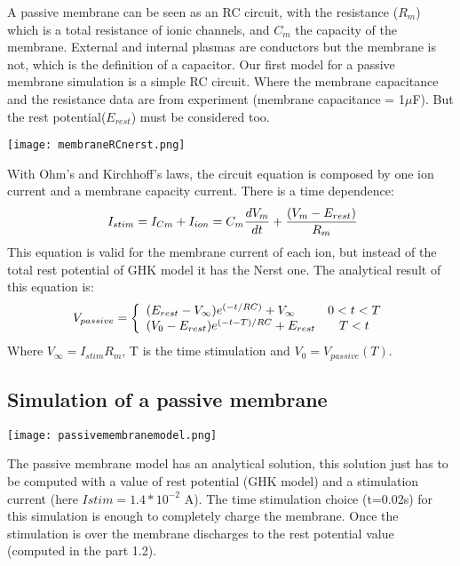 \documentclass[a4paper,11pt]{report}
\begin{document}
A passive membrane can be seen as an RC circuit, with the resistance ($R_{m}$) which is a total resistance of ionic channels, and $C_{m}$ the capacity of the membrane. External and internal plasmas are conductors but the membrane is not, which is the definition of a capacitor. Our first model for a passive membrane simulation is a simple RC circuit. Where the membrane capacitance and the resistance data are from experiment (membrane capacitance = 1$\mu$F). But the rest potential($E_{rest}$) must be considered too.
\begin{center}
\texttt{[image: membraneRCnerst.png]} 
\label{fig1}
\end{center}
With Ohm's and Kirchhoff's laws, the circuit equation is composed by one ion current and a membrane capacity current. There is a time dependence:\\  
$$
\ I_{stim}=I_{Cm}+I_{ion}=C_{m} \frac{dV_{m}}{dt}+ \frac{(V_{m}-E_{rest})}{R_{m}} \\
$$
This equation is valid for the membrane current of each ion, but instead of the total rest potential of GHK model it has the Nerst one. The analytical result of this equation is:\\
$$
 V_{passive}=
\left\{
\begin{array}{l c} 
(E_{rest}-V_{\infty})e^{(-t/RC)}+V_{\infty} & 0 < t < T \\
(V_{0}-E_{rest})e^{(-t-T)/RC}+E_{rest} & T < t 
\end{array}
\right.
$$
Where $V_{\infty}=I_{stim}R_{m}$, T is the time stimulation and $V_{0} =V_{passive}(T)$.  \cite{Tranquillo2009} \\

\subsection{Simulation of a passive membrane}


\begin{minipage}{0.5\linewidth}
\texttt{[image: passivemembranemodel.png]} 
\label{fig1}
\end{minipage}\hfill
\begin{minipage}{0.45\linewidth}
The passive membrane model has an analytical solution, this solution just has to be computed with a value of rest potential (GHK model) and a stimulation current (here $Istim=1.4*10^{-2}$ A). The time stimulation  choice (t=0.02s) for this simulation is enough to completely charge the membrane. Once the stimulation is over the membrane discharges to the rest potential value (computed in the part 1.2). 
\end{minipage}
\end{document}
